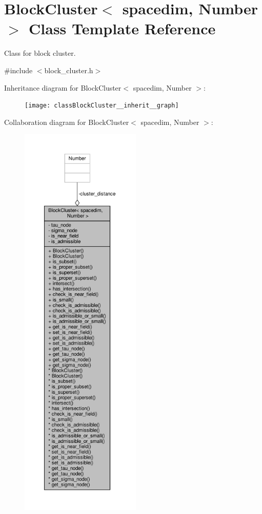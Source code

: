 \hypertarget{classBlockCluster}{}\section{Block\+Cluster$<$ spacedim, Number $>$ Class Template Reference}
\label{classBlockCluster}


Class for block cluster.  




{\ttfamily \#include $<$block\+\_\+cluster.\+h$>$}



Inheritance diagram for Block\+Cluster$<$ spacedim, Number $>$\+:\nopagebreak
\begin{figure}[H]
\begin{center}
\leavevmode
\texttt{[image: classBlockCluster\_\_inherit\_\_graph]}
\end{center}
\end{figure}


Collaboration diagram for Block\+Cluster$<$ spacedim, Number $>$\+:\nopagebreak
\begin{figure}[H]
\begin{center}
\leavevmode
\includegraphics[height=550pt]{classBlockCluster__coll__graph}
\end{center}
\end{figure}

